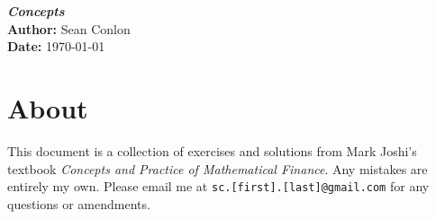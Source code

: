 \documentclass{article}
\begin{document}
\begin{titlepage}
    \centering
    {\Huge \textbf{\textit{Concepts}}}\\[1.5cm] %
    \textbf{Author:} Sean Conlon\\[1cm] %
    \textbf{Date:} \today\\[3cm] %
    
    \section*{About}
    This document is a collection of exercises and solutions from Mark Joshi's textbook \textit{Concepts and Practice of Mathematical Finance}. Any mistakes are entirely my own. Please email me at \texttt{sc.[first].[last]@gmail.com} for any questions or amendments.\\[2cm]

    \tableofcontents
    
\end{titlepage}







% 

\newpage
 
\end{document}
